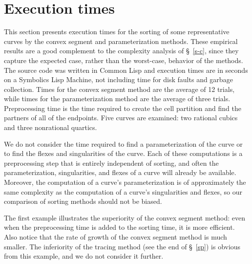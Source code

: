\section{Execution times}
\label{data}
This section presents execution times for the sorting of some representative
curves by the convex segment and parameterization methods.
These empirical results are a good complement to the complexity analysis 
of \S~\ref{s-c}, since they capture the expected case, rather than 
the worst-case, behavior of the methods.
The source code was written in Common Lisp and
execution times are in seconds on a Symbolics Lisp Machine, 
not including time for disk faults and garbage collection.
Times for the convex segment method are the average of 12 trials, 
while times for the parameterization method are the average of three trials.
Preprocessing time is the time required to create the cell partition 
and find the partners of all of the endpoints.
Five curves are examined: two rational cubics and three nonrational 
quartics.

We do not consider the time required to find a parameterization of the
curve or to find the flexes and singularities of the curve.
Each of these computations is a preprocessing step that is 
entirely independent of sorting, and often the parameterization, 
singularities, 
and flexes of a curve will already be available.
Moreover, the computation of a curve's parameterization is of 
approximately the same
complexity as the computation of a curve's singularities and flexes,
so our comparison of sorting methods should not be biased.

The first example illustrates the superiority of the convex segment method:
even when the preprocessing time is added to the sorting time, it is 
more efficient.
Also notice that the rate of growth of the convex segment method is 
much smaller.
The inferiority of the tracing method (see the end of \S~\ref{sp})
is obvious from this example, and we do not consider it further.

\vspace{.2in}


